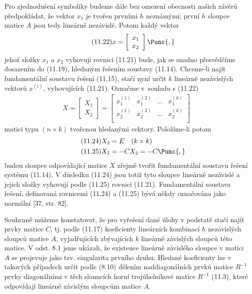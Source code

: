 Pro zjednodušení symboliky budeme dále bez omezení obecnosti
našich závěrů předpokládat, že vektor $x_1$ je tvořen prvními $h$
neznámými; první $h$ sloupce matice $A$ jsou tedy lineárně nezávislé.
Potom každý vektor
%
\begin{align*}
  \tag{11.22}
  x = \left[
    \begin{array}{c}
      x_1 \\ x_2
    \end{array} \right] \Punc{,}
\end{align*}
%
jehož složky $x_1$ a $x_2$ vyhovují rovnici (11.21) bude, jak se
snadno přesvědčíme dosazením do (11.19), hledaným řešením soustavy
(11.14). Chceme-li najít fundamentální soustavu řešení (11.15),
stačí nyní určit $k$ lineárně nezávislých vektorů $x^{(i)\!}$, vyhovujících
%
(11.21). Označme  v~souladu s (11.22)
%
\begin{align*}
  \tag{11.23}
  X = \left[
    \begin{array}{c}
      X_1 \\ X_2
    \end{array} \right] =
  \left[
    \begin{array}{cccc}
      x_1^{(1)} & x_1^{(2)} & \ldots & x_1^{(k)}  \\
      x_2^{(1)} & x_2^{(2)} & \ldots & x_2^{(k)}  \\
    \end{array} \right]
\end{align*}
%
matici typu $(n \times k)$ tvořenou hledanými vektory. Položíme-li
potom
%
\begin{align*}
  \tag{11.24}   X_2 &= E\quad (k \times k) \\
  \tag{11.25}   X_1 &= -C X_2 = -C \Punc{,}
\end{align*}
%
budou sloupce odpovídající matice $X$ zřejmě tvořit fundamentální
soustavu řešení systému (11.14). V důsledku (11.24) jsou
totiž tyto sloupce lineárně nezávislé a jejich složky vyhovují
podle (11.25) rovnici (11.21). Fundamentální soustava řešení,
definovaná rovnicemi (11.24) a (11.25) bývá někdy označována jako
normální [37, str. 82].

Souhrnně můžeme konstatovat, že pro vyřešení dané úlohy v podstatě
stačí najít prvky matice $C$, tj. podle (11.17) koeficienty lineárních
kombinací $h$ nezávislých sloupců matice $A$, vyjadřujících
zbývajících $k$ lineárně závislých sloupců této matice.  V odst. 8.1
jsme ukázali, že existence lineárně závislého sloupce v matici $A$ se
projevuje jako tzv. singularita prvního druhu.  Hledané koeficienty
lze v takových případech určit podle (8.10) dělením naddiagonálních
prvků matice $R^{-1}$ prvky diagonálními v těch slouncích horní
trojúhelníkové matice $R^{-1}$ (11.3), které odpovídají lineárně
závislým sloupcům matice $A$.

